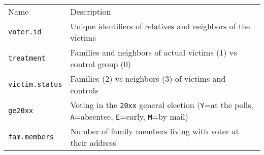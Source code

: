 \documentclass[]{article}
\begin{document}
\begin{longtable}[c]{@{}ll@{}}
\toprule\addlinespace
\begin{minipage}[b]{0.24\columnwidth}\raggedright
Name
\end{minipage} & \begin{minipage}[b]{0.69\columnwidth}\raggedright
Description
\end{minipage}
\\\addlinespace
\midrule\endhead
\begin{minipage}[t]{0.24\columnwidth}\raggedright
\texttt{voter.id}
\end{minipage} & \begin{minipage}[t]{0.69\columnwidth}\raggedright
Unique identifiers of relatives and neighbors of the victims
\end{minipage}
\\\addlinespace
\begin{minipage}[t]{0.24\columnwidth}\raggedright
\texttt{treatment}
\end{minipage} & \begin{minipage}[t]{0.69\columnwidth}\raggedright
Families and neighbors of actual victims (1) vs control group (0)
\end{minipage}
\\\addlinespace
\begin{minipage}[t]{0.24\columnwidth}\raggedright
\texttt{victim.status}
\end{minipage} & \begin{minipage}[t]{0.69\columnwidth}\raggedright
Families (2) vs neighbors (3) of victims and controls
\end{minipage}
\\\addlinespace
\begin{minipage}[t]{0.24\columnwidth}\raggedright
\texttt{ge20xx}
\end{minipage} & \begin{minipage}[t]{0.69\columnwidth}\raggedright
Voting in the \texttt{20xx} general election (\texttt{Y}=at the polls,
\texttt{A}=absentee, \texttt{E}=early, \texttt{M}=by mail)
\end{minipage}
\\\addlinespace
\begin{minipage}[t]{0.24\columnwidth}\raggedright
\texttt{fam.members}
\end{minipage} & \begin{minipage}[t]{0.69\columnwidth}\raggedright
Number of family members living with voter at their address
\end{minipage}

\end{longtable}
\end{document}
